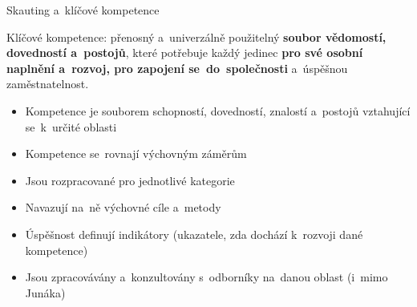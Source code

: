 \documentclass[compress, ucs, xelatex, 11pt, xcolor=dvipsnames, print,
	hyperref={
		bookmarks=true,
		unicode=true,
		colorlinks=true,
		pdftitle={Skautska vychovna metoda},
		plainpages=false,
		pdfauthor={Vojtech Zeisek},
		pdfsubject={Skautska vychovna metoda a jeji vyvoj za posledni stoleti a desetileti},
		pdfcreator={XeLaTeX},
		pdfkeywords={Junak, Pedagogika, Skaut, Skauting, Vychovna metoda},
		linkcolor=Black,
		anchorcolor=Black,
		citecolor=OliveGreen,
		filecolor=OliveGreen,
		menucolor=Black,
		urlcolor=OliveGreen,
		pdftex},
	url={hyphens, lowtilde} %
	]{beamer}
\begin{document}
\begin{frame}{Skauting a~klíčové kompetence}
	\begin{center}
		Klíčové kompetence: přenosný a~univerzálně použitelný \textbf{soubor vědomostí, dovedností a~postojů}, které potřebuje každý jedinec \textbf{pro své osobní naplnění a~rozvoj, pro zapojení se~do~společnosti} a~úspěšnou zaměstnatelnost.
	\end{center}
	\begin{itemize}
		\item Kompetence je souborem schopností, dovedností, znalostí a~postojů vztahující se~k~určité oblasti
		\item Kompetence se~rovnají výchovným záměrům
		\item Jsou rozpracované pro jednotlivé kategorie
		\item Navazují na~ně výchovné cíle a~metody
		\item Úspěšnost definují indikátory (ukazatele, zda dochází k~rozvoji dané kompetence)
		\item Jsou zpracovávány a~konzultovány s~odborníky na~danou oblast (i~mimo Junáka)
	\end{itemize}
\end{frame}
\end{document}
